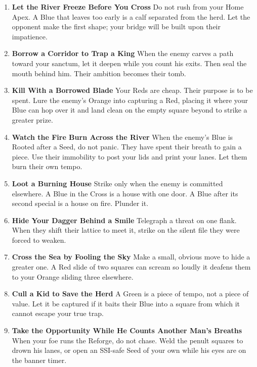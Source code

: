 \documentclass[11pt,letterpaper]{article}
\begin{document}
\begin{enumerate}
\item \textbf{Let the River Freeze Before You Cross}
Do not rush from your Home Apex. A Blue that leaves too early is a calf separated from the herd. Let the opponent make the first shape; your bridge will be built upon their impatience.

\item \textbf{Borrow a Corridor to Trap a King}
When the enemy carves a path toward your sanctum, let it deepen while you count his exits. Then seal the mouth behind him. Their ambition becomes their tomb.

\item \textbf{Kill With a Borrowed Blade}
Your Reds are cheap. Their purpose is to be spent. Lure the enemy's Orange into capturing a Red, placing it where your Blue can hop over it and land clean on the empty square beyond to strike a greater prize.

\item \textbf{Watch the Fire Burn Across the River}
When the enemy's Blue is Rooted after a Seed, do not panic. They have spent their breath to gain a piece. Use their immobility to post your lids and print your lanes. Let them burn their own tempo.

\item \textbf{Loot a Burning House}
Strike only when the enemy is committed elsewhere. A Blue in the Cross is a house with one door. A Blue after its second special is a house on fire. Plunder it.

\item \textbf{Hide Your Dagger Behind a Smile}
Telegraph a threat on one flank. When they shift their lattice to meet it, strike on the silent file they were forced to weaken.

\item \textbf{Cross the Sea by Fooling the Sky}
Make a small, obvious move to hide a greater one. A Red slide of two squares can scream so loudly it deafens them to your Orange sliding three elsewhere.

\item \textbf{Cull a Kid to Save the Herd}
A Green is a piece of tempo, not a piece of value. Let it be captured if it baits their Blue into a square from which it cannot escape your true trap.

\item \textbf{Take the Opportunity While He Counts Another Man's Breaths}
When your foe runs the Reforge, do not chase. Weld the penult squares to drown his lanes, or open an SSI-safe Seed of your own while his eyes are on the banner timer.


\end{enumerate}
\end{document}
